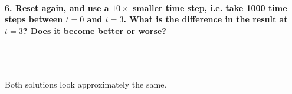 \paragraph{6. Reset again, and use a $10\times$ smaller 
    time step, i.e. take 1000 time steps between $t=0$ and 
    $t=3$. What is the difference in the result at $t=3$? 
    Does it become better or worse?
} \ \\
    \begin{figure}[h!]
        \centering
        \begin{minipage}{.5\linewidth}
          \centering
        \end{minipage}%
        \begin{minipage}{.5\linewidth}
          \centering
        \end{minipage}
    \end{figure} \ \\
    Both solutions look approximately the same.

